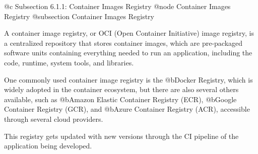 @c Subsection 6.1.1: Container Images Registry
@node Container Images Registry
@subsection Container Images Registry

A container image registry, or OCI (Open Container Initiative) image registry, is a centralized repository that stores container images, which are pre-packaged software units containing everything needed to run an application, including the code, runtime, system tools, and libraries.

One commonly used container image registry is the @b{Docker Registry}, which is widely adopted in the container ecosystem, but there are also several others available, such as @b{Amazon Elastic Container Registry (ECR)}, @b{Google Container Registry (GCR)}, and @b{Azure Container Registry (ACR)}, accessible through several cloud providers.

This registry gets updated with new versions through the CI pipeline of the application being developed.
